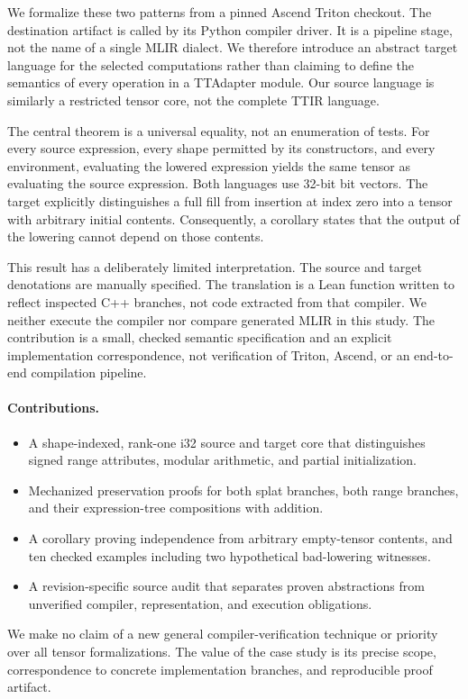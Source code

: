 \documentclass[a4paper,USenglish,anonymous]{lipics-v2021}
\newcommand{\code}[1]{\texttt{\detokenize{#1}}}
\begin{document}
We formalize these two patterns from a pinned Ascend Triton checkout. The
destination artifact is called \code{ttadapter} by its Python compiler
driver. It is a pipeline stage, not the name of a single MLIR dialect. We
therefore introduce an abstract target language for the selected computations
rather than claiming to define the semantics of every operation in a
TTAdapter module. Our source language is similarly a restricted tensor core,
not the complete TTIR language.

The central theorem is a universal equality, not an enumeration of tests.
For every source expression, every shape permitted by its constructors, and
every environment, evaluating the lowered expression yields the same tensor
as evaluating the source expression. Both languages use 32-bit bit vectors.
The target explicitly distinguishes a full fill from insertion at index zero
into a tensor with arbitrary initial contents. Consequently, a corollary
states that the output of the lowering cannot depend on those contents.

This result has a deliberately limited interpretation. The source and target
denotations are manually specified. The translation is a Lean function
written to reflect inspected C++ branches, not code extracted from that
compiler. We neither execute the compiler nor compare generated MLIR in
this study. The contribution is a small, checked semantic specification and
an explicit implementation correspondence, not verification of Triton,
Ascend, or an end-to-end compilation pipeline.

\paragraph{Contributions.}
\begin{itemize}
\item A shape-indexed, rank-one i32 source and target core that distinguishes
signed range attributes, modular arithmetic, and partial initialization.
\item Mechanized preservation proofs for both splat branches, both range
branches, and their expression-tree compositions with addition.
\item A corollary proving independence from arbitrary empty-tensor contents,
and ten checked examples including two hypothetical bad-lowering witnesses.
\item A revision-specific source audit that separates proven abstractions
from unverified compiler, representation, and execution obligations.
\end{itemize}
We make no claim of a new general compiler-verification technique or priority
over all tensor formalizations. The value of the case study is its precise
scope, correspondence to concrete implementation branches, and reproducible
proof artifact.
\end{document}
